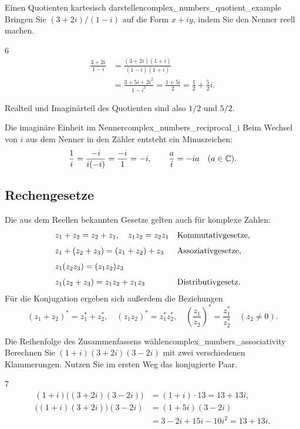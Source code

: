 \begin{ExampleBox}{Einen Quotienten kartesisch darstellen}{complex_numbers_quotient_example}
  Bringen Sie $(3+2i)/(1-i)$ auf die Form $x+iy$, indem Sie den Nenner reell machen.
  \begin{ClozeArea}{6}
    \[
      \begin{aligned}
        \frac{3+2i}{1-i}
          &=\frac{(3+2i)(1+i)}{(1-i)(1+i)}\\[6pt]
          &=\frac{3+5i+2i^2}{1-i^2}
           =\frac{1+5i}{2}=\frac12+\frac52i.
      \end{aligned}
    \]
  \end{ClozeArea}
  Realteil und Imaginärteil des Quotienten sind also $1/2$ und $5/2$.
\end{ExampleBox}
\begin{KeyPointBox}{Die imaginäre Einheit im Nenner}{complex_numbers_reciprocal_i}
  Beim Wechsel von $i$ aus dem Nenner in den Zähler entsteht ein Minuszeichen:
  \[
    \frac1i=\frac{-i}{i(-i)}=\frac{-i}{1}=-i,
    \qquad \frac{a}{i}=-ia\quad(a\in\mathbb{C}).
  \]
\end{KeyPointBox}

\clearpage
\subsection{Rechengesetze}
Die aus dem Reellen bekannten Gesetze gelten auch für komplexe Zahlen:
\[
  \begin{array}{@{}ll@{}}
    z_1+z_2=z_2+z_1,\quad z_1z_2=z_2z_1
      &\text{Kommutativgesetze},\\[7pt]
    z_1+(z_2+z_3)=(z_1+z_2)+z_3
      &\text{Assoziativgesetze},\\[7pt]
    z_1(z_2z_3)=(z_1z_2)z_3&\\[7pt]
    z_1(z_2+z_3)=z_1z_2+z_1z_3
      &\text{Distributivgesetz}.
  \end{array}
\]
Für die Konjugation ergeben sich außerdem die Beziehungen
\[
  (z_1+z_2)^*=z_1^*+z_2^*,\quad
  (z_1z_2)^*=z_1^*z_2^*,\quad
  \left(\frac{z_1}{z_2}\right)^*=\frac{z_1^*}{z_2^*}\quad(z_2\ne0).
\]
\begin{ExampleBox}{Die Reihenfolge des Zusammenfassens wählen}{complex_numbers_associativity}
  Berechnen Sie $(1+i)(3+2i)(3-2i)$ mit zwei verschiedenen Klammerungen.
  Nutzen Sie im ersten Weg das konjugierte Paar.
  \begin{ClozeArea}{7}
    \[
      \begin{aligned}
        (1+i)\bigl((3+2i)(3-2i)\bigr)
          &=(1+i)\cdot13=13+13i,\\[6pt]
        \bigl((1+i)(3+2i)\bigr)(3-2i)
          &=(1+5i)(3-2i)\\[6pt]
          &=3-2i+15i-10i^2=13+13i.
      \end{aligned}
    \]
  \end{ClozeArea}
\end{ExampleBox}

